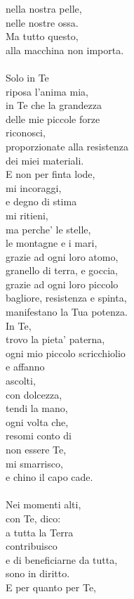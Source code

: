 \begin{haiku}
nella nostra pelle,\\
nelle nostre ossa.\\
Ma tutto questo,\\
alla macchina non importa.\\
\leavevmode\\
Solo in Te\\
riposa l'anima mia,\\
in Te che la grandezza\\
delle mie piccole forze\\
riconosci,\\
proporzionate alla resistenza\\
dei miei materiali.\\
E non per finta lode,\\
mi incoraggi,\\
e degno di stima\\
mi ritieni,\\
ma perche' le stelle, \\
le montagne e i mari,\\
grazie ad ogni loro atomo,\\
granello di terra, e goccia,\\
grazie ad ogni loro piccolo\\
bagliore, resistenza e spinta,\\
manifestano la Tua potenza.\\
In Te,\\
trovo la pieta' paterna,\\
ogni mio piccolo scricchiolio\\
e affanno\\
ascolti,\\
con dolcezza,\\
tendi la mano,\\
ogni volta che,\\
resomi conto di \\
non essere Te,\\
mi smarrisco,\\
e chino
il capo cade.\\
\leavevmode\\
Nei momenti alti,\\
con Te, dico:\\
a tutta la Terra\\
contribuisco\\
e di beneficiarne da tutta,\\
sono in diritto.\\
E per quanto per Te,\\

\end{haiku}
